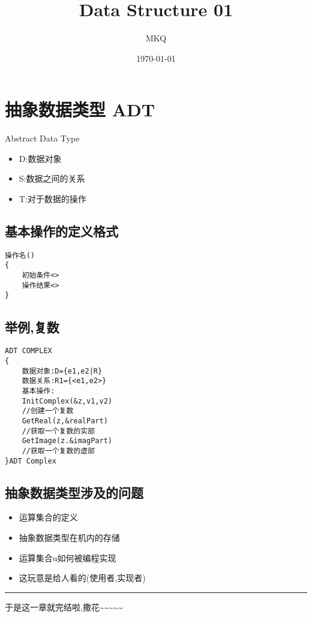 \documentclass[11pt]{article}
\author{MKQ}
\date{\today}
\title{Data Structure 01}
\begin{document}
\maketitle
\tableofcontents

\section{抽象数据类型 ADT}
\label{sec:org2ca5767}
Abstract Data Type
\begin{itemize}
\item D:数据对象
\item S:数据之间的关系
\item T:对于数据的操作
\end{itemize}

\subsection{基本操作的定义格式}
\label{sec:orga62b5ae}
\begin{verbatim}
操作名()
{
    初始条件<>
    操作结果<>
}
\end{verbatim}

\subsection{举例,复数}
\label{sec:org7c7eb62}
\begin{verbatim}
ADT COMPLEX
{
    数据对象:D={e1,e2|R}
    数据关系:R1={<e1,e2>}
    基本操作:
	InitComplex(&z,v1,v2)
	//创建一个复数
	GetReal(z,&realPart)
	//获取一个复数的实部
	GetImage(z.&imagPart)
	//获取一个复数的虚部
}ADT Complex
\end{verbatim}
\subsection{抽象数据类型涉及的问题}
\label{sec:org7676452}
\begin{itemize}
\item 运算集合的定义
\item 抽象数据类型在机内的存储
\item 运算集合u如何被编程实现
\item 这玩意是给人看的(使用者,实现者)
\end{itemize}

\rule{\linewidth}{0.5pt}
于是这一章就完结啦,撒花\textasciitilde{}\textasciitilde{}\textasciitilde{}\textasciitilde{}\textasciitilde{}
\end{document}
